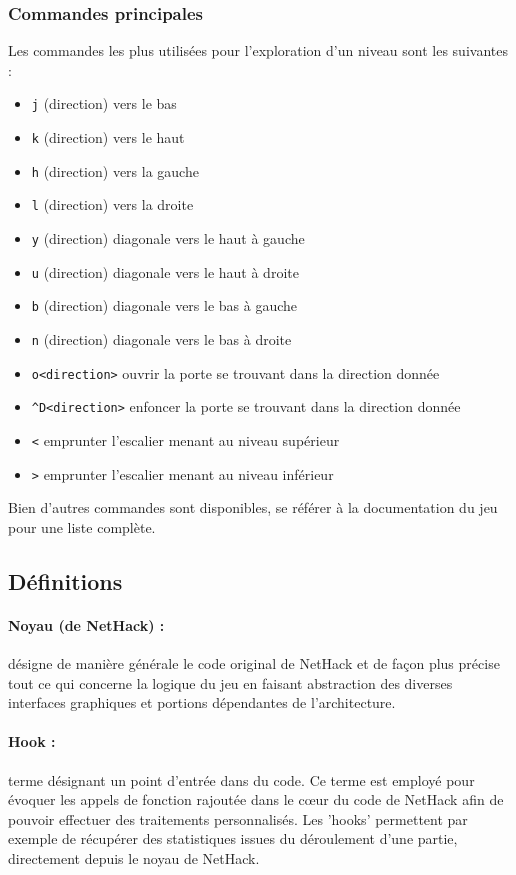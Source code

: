 \documentclass[a4paper,12pt]{article}
\begin{document}
\subsubsection*{Commandes principales}

Les commandes les plus utilisées pour l'exploration d'un niveau sont les suivantes :

\begin{itemize}
	\item \verb!j! (direction) vers le bas
	\item \verb!k! (direction) vers le haut
	\item \verb!h! (direction) vers la gauche
	\item \verb!l! (direction) vers la droite
	\item \verb!y! (direction) diagonale vers le haut à gauche
	\item \verb!u! (direction) diagonale vers le haut à droite
	\item \verb!b! (direction) diagonale vers le bas à gauche
	\item \verb!n! (direction) diagonale vers le bas à droite
	\item \verb!o<direction>! ouvrir la porte se trouvant dans la direction donnée
	\item \verb!^D<direction>! enfoncer la porte se trouvant dans la direction donnée
	\item \verb!<! emprunter l'escalier menant au niveau supérieur
	\item \verb!>! emprunter l'escalier menant au niveau inférieur
\end{itemize}

Bien d'autres commandes sont disponibles, se référer à la documentation du
jeu pour une liste complète.

\subsection*{Définitions}

\paragraph{Noyau (de NetHack) :}désigne de manière générale le code original de
NetHack et de façon plus précise tout ce qui concerne la logique du jeu en
faisant abstraction des diverses interfaces graphiques et portions dépendantes
de l'architecture.

\paragraph{Hook :}terme désignant un point d'entrée dans du code. Ce terme est
employé pour évoquer les appels de fonction rajoutée dans le cœur du code
de NetHack afin de pouvoir effectuer des traitements personnalisés. Les
'hooks' permettent par exemple de récupérer des statistiques issues du
déroulement d'une partie, directement depuis le noyau de NetHack.
\end{document}
